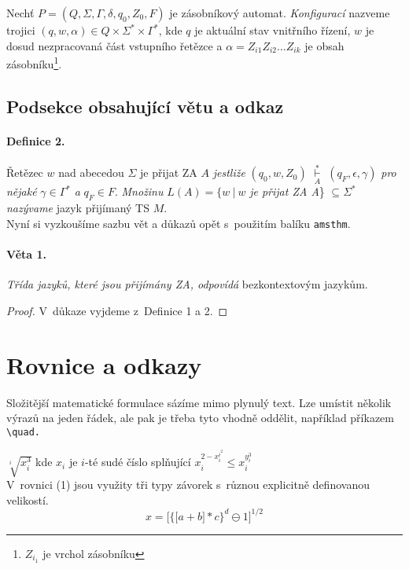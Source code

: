 \documentclass[a4paper,11pt,twocolumn]{article}
\begin{document}
Nechť $P = (Q, \Sigma, \Gamma, \delta, q_0, Z_0, F)$ je zásobníkový automat. \emph{Konfigurací} nazveme trojici $(q, w, \alpha) \in Q\times\Sigma^{*}\times\Gamma^{*}$, kde $q$ je aktuální stav vnitřního řízení, $w$ je dosud nezpracovaná část vstupního řetězce a $\alpha = Z_{i1}Z_{i2}\dots Z_{ik}$ je obsah zásobníku\footnote{$Z_{i_{1}}$ je vrchol zásobníku}.

\subsection{Podsekce obsahující větu a odkaz}
\paragraph{Definice 2.}Řetězec $w$ nad abecedou $\Sigma$ je přijat ZA $A$ \emph{jestliže} $(q_0, w, Z_0)$ 
$\underset{A}{\overset{*}{\vdash}}$
$(q_F,\epsilon,\gamma)$ \emph{pro nějaké} $\gamma \in \Gamma^{*}$ \emph{a} $q_F \in F.$
\emph{Množinu} $L(A) =\{ w\  |\  w$ \emph{je přijat ZA A}\} $\subseteq \Sigma^*$ \emph{nazývame} jazyk přijímaný TS $M$.\\

Nyní si vyzkoušíme sazbu vět a důkazů opět s~použitím
balíku \texttt{amsthm}.

\paragraph{Věta 1.} \emph{Třída jazyků, které jsou přijímány ZA, odpovídá}
bezkontextovým jazykům.

\begin{proof} V~důkaze vyjdeme z~Definice 1 a 2.\end{proof} 

\section{Rovnice a odkazy}
Složitější matematické formulace sázíme mimo plynulý
text. Lze umístit několik výrazů na jeden řádek, ale pak je
třeba tyto vhodně oddělit, například příkazem \verb/\quad./
\bigskip

$\sqrt[i]{x_i^3}$ kde $x_i$ je $i$-té sudé číslo splňující $x_i^{2-x_i^{i^2}} \leq x_i^{y_i^3}$\\

V~rovnici (1) jsou využity tři typy závorek s~různou
explicitně definovanou velikostí.
\begin{equation}
x = \bigg[\Big\{\big[a+b\big]*c\Big\}^d\ominus 1\bigg]^{1/2}
\end{equation}
\end{document}
